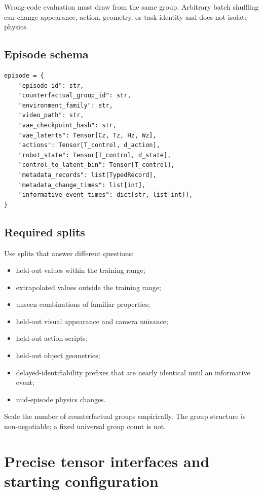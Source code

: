 \documentclass[11pt]{article}
\begin{document}
Wrong-code evaluation must draw from the same group.  Arbitrary batch shuffling
can change appearance, action, geometry, or task identity and does not isolate
physics.

\subsection{Episode schema}

\begin{lstlisting}[style=pythonstyle,caption={Recommended cached episode schema.}]
episode = {
    "episode_id": str,
    "counterfactual_group_id": str,
    "environment_family": str,
    "video_path": str,
    "vae_checkpoint_hash": str,
    "vae_latents": Tensor[Cz, Tz, Hz, Wz],
    "actions": Tensor[T_control, d_action],
    "robot_state": Tensor[T_control, d_state],
    "control_to_latent_bin": Tensor[T_control],
    "metadata_records": list[TypedRecord],
    "metadata_change_times": list[int],
    "informative_event_times": dict[str, list[int]],
}
\end{lstlisting}

\subsection{Required splits}

Use splits that answer different questions:
\begin{itemize}
  \item held-out values within the training range;
  \item extrapolated values outside the training range;
  \item unseen combinations of familiar properties;
  \item held-out visual appearance and camera nuisance;
  \item held-out action scripts;
  \item held-out object geometries;
  \item delayed-identifiability prefixes that are nearly identical until an
  informative event;
  \item mid-episode physics changes.
\end{itemize}

Scale the number of counterfactual groups empirically.  The group structure is
non-negotiable; a fixed universal group count is not.

\section{Precise tensor interfaces and starting configuration}
\end{document}
